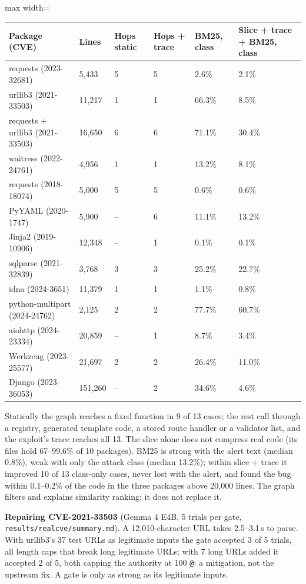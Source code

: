 \documentclass[10pt,a4paper]{article}
\begin{document}
\begin{table}[H]\centering\small
\begin{adjustbox}{max width=\linewidth}
\begin{tabular}{llllll}
\toprule
Package (CVE) & Lines & Hops static & Hops + trace & BM25, class & Slice + trace + BM25, class\\
\midrule
requests (2023-32681) & 5,433 & 5 & 5 & 2.6\% & 2.1\%\\
urllib3 (2021-33503) & 11,217 & 1 & 1 & 66.3\% & 8.5\%\\
requests + urllib3 (2021-33503) & 16,650 & 6 & 6 & 71.1\% & 30.4\%\\
waitress (2022-24761) & 4,956 & 1 & 1 & 13.2\% & 8.1\%\\
requests (2018-18074) & 5,000 & 5 & 5 & 0.6\% & 0.6\%\\
PyYAML (2020-1747) & 5,900 & -- & 6 & 11.1\% & 13.2\%\\
Jinja2 (2019-10906) & 12,348 & -- & 1 & 0.1\% & 0.1\%\\
sqlparse (2021-32839) & 3,768 & 3 & 3 & 25.2\% & 22.7\%\\
idna (2024-3651) & 11,379 & 1 & 1 & 1.1\% & 0.8\%\\
python-multipart (2024-24762) & 2,125 & 2 & 2 & 77.7\% & 60.7\%\\
aiohttp (2024-23334) & 20,859 & -- & 1 & 8.7\% & 3.4\%\\
Werkzeug (2023-25577) & 21,697 & 2 & 2 & 26.4\% & 11.0\%\\
Django (2023-36053) & 151,260 & -- & 2 & 34.6\% & 4.6\%\\
\bottomrule
\end{tabular}
\end{adjustbox}
\end{table}
Statically the graph reaches a fixed function in 9 of 13 cases; the rest call through a registry, generated template code, a stored route handler or a validator list, and the exploit's trace reaches all 13. The slice alone does not compress real code (its files hold 67--99.6\% of 10 packages). BM25 is strong with the alert text (median 0.8\%), weak with only the attack class (median 13.2\%); within slice + trace it improved 10 of 13 class-only cases, never lost with the alert, and found the bug within 0.1--0.2\% of the code in the three packages above 20,000 lines. The graph filters and explains similarity ranking; it does not replace it.

\textbf{Repairing CVE-2021-33503} (Gemma 4 E4B, 5 trials per gate, \texttt{results/realcve/summary.md}). A 12,010-character URL takes 2.5--3.1\,s to parse. With urllib3's 37 test URLs as legitimate inputs the gate accepted 3 of 5 trials, all length caps that break long legitimate URLs; with 7 long URLs added it accepted 2 of 5, both capping the authority at 100 \texttt{@}: a mitigation, not the upstream fix. A gate is only as strong as its legitimate inputs.
\end{document}
